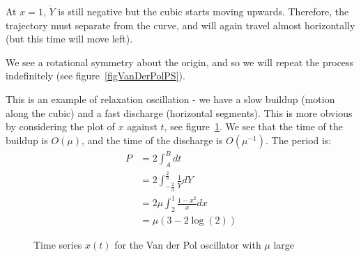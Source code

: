 \documentclass[../Main.tex]{subfiles}
\begin{document}
At $x = 1$, $\dot{Y}$ is still negative but the cubic starts moving upwards. Therefore, the trajectory must separate from the curve, and will again travel almost horizontally (but this time will move left).

We see a rotational symmetry about the origin, and so we will repeat the process indefinitely (see figure~\ref{figVanDerPolPS}).

This is an example of relaxation oscillation - we have a slow buildup (motion along the cubic) and a fast discharge (horizontal segments). This is more obvious by considering the plot of $x$ against $t$, see figure~\ref{figVanDerPolXOssc}. We see that the time of the buildup is $O(\mu)$, and the time of the discharge is $O(\mu^{-1})$. The period is:
\begin{align*}
    P &= 2 \int_{A}^{B} dt \\
    &= 2 \int_{-\frac23}^{\frac23} \frac1{\dot{Y}} dY \\
    &= 2\mu \int_{2}^{1} \frac{1-x^2}{x} dx \\
    &= \mu (3 - 2\log(2))
\end{align*} 

\begin{figure}
    \centering
    \caption{Time series $x(t)$ for the Van der Pol oscillator with $\mu$ large}
    \label{figVanDerPolXOssc}
\end{figure}
\end{document}
